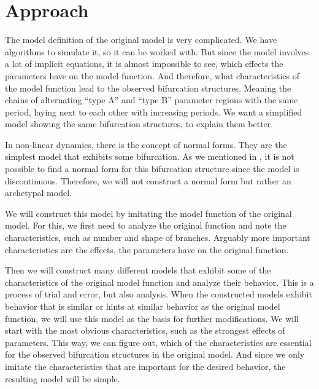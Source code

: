 \chapter{Approach}
\label{chap:approach}

The model definition of the original model is very complicated.
We have algorithms to simulate it, so it can be worked with.
But since the model involves a lot of implicit equations, it is almost impossible to see, which effects the parameters have on the model function.
And therefore, what characteristics of the model function lead to the observed bifurcation structures.
Meaning the chains of alternating ``type A'' and ``type B'' parameter regions with the same period, laying next to each other with increasing periods.
We want a simplified model showing the same bifurcation structures, to explain them better.

In non-linear dynamics, there is the concept of normal forms.
They are the simplest model that exhibits some bifurcation.
As we mentioned in , it is not possible to find a normal form for this bifurcation structure since the model is discontinuous.
Therefore, we will not construct a normal form but rather an archetypal model.

We will construct this model by imitating the model function of the original model.
For this, we first need to analyze the original function and note the characteristics, such as number and shape of branches.
Arguably more important characteristics are the effects, the parameters have on the original function.

Then we will construct many different models that exhibit some of the characteristics of the original model function and analyze their behavior.
This is a process of trial and error, but also analysis.
When the constructed models exhibit behavior that is similar or hints at similar behavior as the original model function, we will use this model as the basis for further modifications.
We will start with the most obvious characteristics, such as the strongest effects of parameters.
This way, we can figure out, which of the characteristics are essential for the observed bifurcation structures in the original model.
And since we only imitate the characteristics that are important for the desired behavior, the resulting model will be simple.
